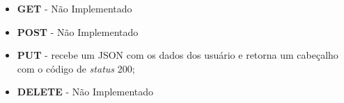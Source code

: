 \begin{tiny}
\begin{enumerate}
\begin{itemize}
\begin{itemize}
						\begin{itemize}
									  \item \textbf{GET} - Não Implementado
									  \item \textbf{POST} - Não Implementado
									  \item \textbf{PUT} - recebe um JSON com os dados dos usuário e
									  retorna um cabeçalho com o código de  \textit{status} 200;
									  \item \textbf{DELETE} - Não Implementado
									\end{itemize}
				\end{itemize}
		\end{itemize}
\end{enumerate}
\end{tiny}